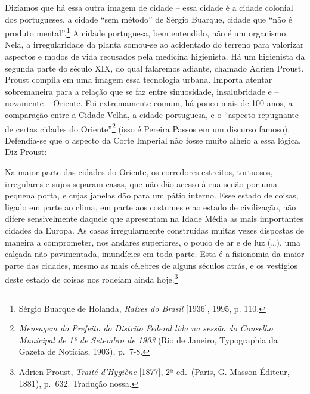 Dizíamos que há essa outra imagem de cidade -- essa cidade é a cidade
colonial dos portugueses, a cidade ``sem método'' de Sérgio Buarque,
cidade que ``não é produto mental''.\footnote{Sérgio Buarque de Holanda,
  \emph{Raízes do Brasil} {[}1936{]}, 1995, p. 110.} A cidade
portuguesa, bem entendido, não é um organismo. Nela, a irregularidade da
planta somou-se ao acidentado do terreno para valorizar aspectos e modos
de vida recusados pela medicina higienista. Há um higienista da segunda
parte do século XIX, do qual falaremos adiante, chamado Adrien Proust.
Proust compila em uma imagem essa tecnologia urbana. Importa atentar
sobremaneira para a relação que se faz entre sinuosidade, insalubridade
e -- novamente -- Oriente. Foi extremamente comum, há pouco mais de 100
anos, a comparação entre a Cidade Velha, a cidade portuguesa, e o
``aspecto repugnante de certas cidades do Oriente''\footnote{\emph{Mensagem
  do Prefeito do Distrito Federal lida na sessão do Conselho Municipal
  de 1º de Setembro de 1903} (Rio de Janeiro, Typographia da Gazeta de
  Notícias, 1903), p.~7-8.} (isso é Pereira Passos em um discurso
famoso). Defendia-se que o aspecto da Corte Imperial não fosse muito
alheio a essa lógica. Diz Proust:

Na maior parte das cidades do Oriente, os corredores estreitos,
tortuosos, irregulares e sujos separam casas, que não dão acesso à rua
senão por uma pequena porta, e cujas janelas dão para um pátio interno.
Esse estado de coisas, ligado em parte ao clima, em parte aos costumes e
ao estado de civilização, não difere sensivelmente daquele que
apresentam na Idade Média as mais importantes cidades da Europa. As
casas irregularmente construídas muitas vezes dispostas de maneira a
comprometer, nos andares superiores, o pouco de ar e de luz (\ldots{}),
uma calçada não pavimentada, imundícies em toda parte. Esta é a
fisionomia da maior parte das cidades, mesmo as mais célebres de alguns
séculos atrás, e os vestígios deste estado de coisas nos rodeiam ainda
hoje.\footnote{Adrien Proust, \emph{Traité d'Hygiène} {[}1877{]}, 2ª
  ed.~(Paris, G. Masson Éditeur, 1881), p.~632. Tradução nossa.}

